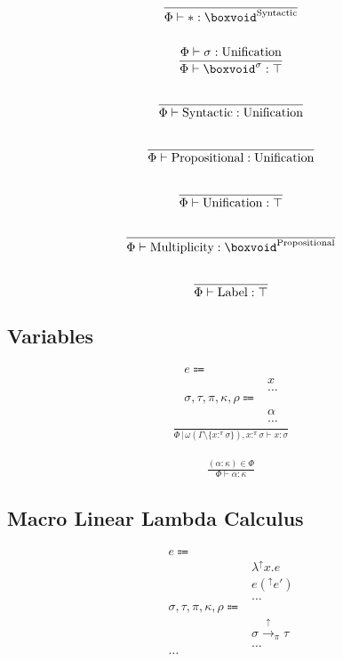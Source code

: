 \documentclass {article}
\begin{document}
\begin{gather*}
\frac
{}
{\Phi \vdash * : \boxvoid^\text{Syntactic}} \\
\\
\frac
{\Phi \vdash \sigma : \text{Unification}}
{\Phi \vdash \boxvoid^\sigma : \top} \\
\\
\frac
{}
{\Phi \vdash \text{Syntactic} : \text{Unification}} \\
\\
\frac
{}
{\Phi \vdash \text{Propositional} : \text{Unification}} \\
\\
\frac
{}
{\Phi \vdash \text{Unification} : \top} \\
\\
\frac
{}
{\Phi \vdash \text{Multiplicity} : \boxvoid^\text{Propositional}} \\
\\
\frac
{}
{\Phi \vdash \text{Label} : \top}
\end{gather*}

\subsection{Variables}
\begin{align*}
e \Coloneqq & \\
& x \tag{Variable} \\
& \dots \\
\sigma, \tau, \pi, \kappa, \rho \Coloneqq & \\
& \alpha \tag{Type Variable} \\
& \dots
\end{align*}
\begin{gather*}
\frac
{}
{\Phi \, | \, \omega (\Gamma \setminus \{x :^\pi \sigma\}), x :^\pi \sigma  \vdash x : \sigma}
\end{gather*}

\begin{gather*}
\frac
{(\alpha : \kappa) \in \Phi}
{\Phi \vdash \alpha : \kappa}
\end{gather*}

\subsection{Macro Linear Lambda Calculus}
\begin{align*}
e \Coloneqq & \\
& \lambda^\uparrow x. e \tag{Macro Lambda}\\
& e(^\uparrow e') \tag{Macro Application}\\
& \dots \\
\sigma, \tau, \pi, \kappa, \rho \Coloneqq & \\
& \sigma \xrightarrow{\uparrow}_\pi \tau \tag{Macro} \\
& \dots \\
\dots
\end{align*}
\end{document}
